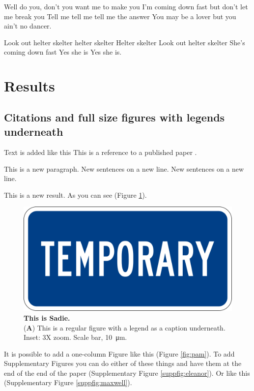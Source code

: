 \documentclass[vruler,JCS]{COB}
\begin{document}
Well do you, don't you want me to make you
I'm coming down fast but don't let me break you
Tell me tell me tell me the answer
You may be a lover but you ain't no dancer.

Look out helter skelter helter skelter
Helter skelter
Look out helter skelter
She's coming down fast 
Yes she is 
Yes she is.


\section{Results}\label{s:results}

\subsection{Citations and full size figures with legends underneath}

Text is added like this
This is a reference to a published paper \citep{watson_molecular_1953}.

This is a new paragraph.
New sentences on a new line.
New sentences on a new line.

This is a new result.
As you can see (Figure \ref{fig:sadie}).

\begin{figure}
\centering
\includegraphics[width=0.75\linewidth]{Figures/temp.png}
\caption{\textbf{This is Sadie.}\\
(\textbf{A}) This is a regular figure with a legend as a caption underneath. Inset: 3X zoom. Scale bar, \SI{10}{\micro\meter}.}
\label{fig:sadie}
\end{figure}

It is possible to add a one-column Figure like this (Figure \ref{fig:pam}).
To add Supplementary Figures you can do either of these things and have them at the end of the end of the paper (Supplementary Figure \ref{suppfig:eleanor}).
Or like this (Supplementary Figure \ref{suppfig:maxwell}).
\end{document}
